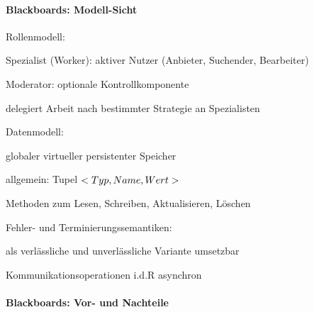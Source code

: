 \documentclass[10pt]{article}
\begin{document}
\paragraph{Blackboards: Modell-Sicht}

\begin{itemize*}
  \item Rollenmodell:
  \begin{itemize*}
    \item Spezialist (Worker): aktiver Nutzer (Anbieter, Suchender, Bearbeiter)
    \item Moderator: optionale Kontrollkomponente
    \begin{itemize*}
      \item delegiert Arbeit nach bestimmter Strategie an Spezialisten
      
    \end{itemize*}
  \end{itemize*}
  \item Datenmodell:
  \begin{itemize*}
    \item globaler virtueller persistenter Speicher
    \item allgemein: Tupel \textbf{$<Typ,\space Name, \space Wert>$}
    \item Methoden zum Lesen, Schreiben, Aktualisieren, Löschen
  \end{itemize*}
  \item Fehler- und Terminierungssemantiken:
  \begin{itemize*}
    \item als verlässliche und unverlässliche Variante umsetzbar
    \item Kommunikationsoperationen i.d.R asynchron
  \end{itemize*}
\end{itemize*}

\paragraph{Blackboards: Vor- und Nachteile}
\end{document}
